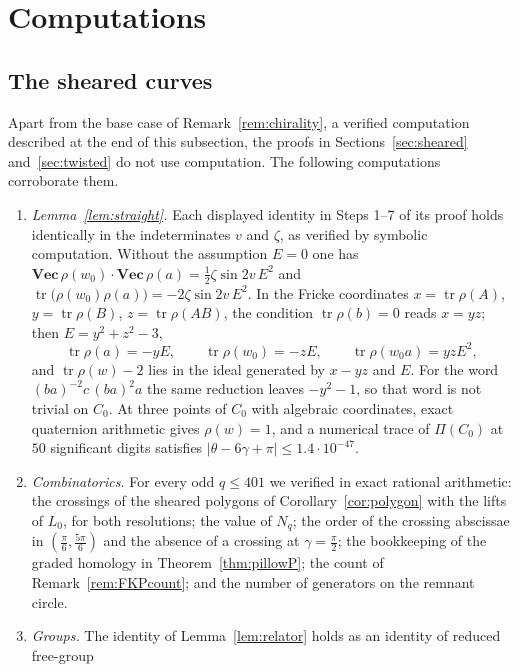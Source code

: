 \section{Computations}\label{app:data}

\subsection{The sheared curves}\label{ss:methods}
Apart from the base case of Remark~\ref{rem:chirality}, a verified computation described at the end of this
subsection, the proofs in Sections~\ref{sec:sheared} and~\ref{sec:twisted} do not use computation.  The following
computations corroborate them.
\begin{enumerate}
\item[(i)] \emph{Lemma~\ref{lem:straight}.}  Each displayed identity in Steps 1--7 of its proof holds
 identically in the indeterminates $v$ and $\zeta$, as verified by symbolic computation.  Without the
 assumption $E=0$ one has $\mathbf{Vec}\,\rho(w_0)\cdot\mathbf{Vec}\,\rho(a)=\frac12\zeta\sin2v\,E^2$ and
 $\operatorname{tr}\bigl(\rho(w_0)\rho(a)\bigr)=-2\zeta\sin2v\,E^2$.  In the Fricke coordinates
 $x=\operatorname{tr}\rho(A)$, $y=\operatorname{tr}\rho(B)$, $z=\operatorname{tr}\rho(AB)$, the condition
 $\operatorname{tr}\rho(b)=0$ reads $x=yz$; then $E=y^2+z^2-3$,
 \[
  \operatorname{tr}\rho(a)=-yE,\qquad \operatorname{tr}\rho(w_0)=-zE,\qquad \operatorname{tr}\rho(w_0a)=yzE^2,
 \]
 and $\operatorname{tr}\rho(w)-2$ lies in the ideal generated by $x-yz$ and $E$.  For the word
 $(ba)^{-2}c\,(ba)^2a$ the same reduction leaves $-y^2-1$, so that word is not trivial on $C_0$.  At three
 points of $C_0$ with algebraic coordinates, exact quaternion arithmetic gives $\rho(w)=1$, and a
 numerical trace of $\Pi(C_0)$ at $50$ significant digits satisfies $|\theta-6\gamma+\pi|\le1.4\cdot10^{-47}$.
\item[(ii)] \emph{Combinatorics.}  For every odd $q\le401$ we verified in exact rational arithmetic: the
 crossings of the sheared polygons of Corollary~\ref{cor:polygon} with the lifts of $L_0$, for both
 resolutions; the value of $N_q$; the order of the crossing abscissae in $(\frac\pi6,\frac{5\pi}6)$ and
 the absence of a crossing at $\gamma=\frac\pi2$; the bookkeeping of the graded homology in
 Theorem~\ref{thm:pillowP}; the count of Remark~\ref{rem:FKPcount}; and the number of generators on the
 remnant circle.
\item[(iii)] \emph{Groups.}  The identity of Lemma~\ref{lem:relator} holds as an identity of reduced free-group

\end{enumerate}
